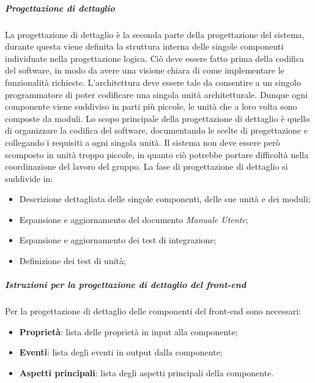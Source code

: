 \subparagraph{Progettazione di dettaglio}
\label{subpar:progettazione_dettaglio}
La progettazione di dettaglio è la seconda parte della progettazione del sistema, durante questa viene definita la struttura interna delle singole componenti individuate nella progettazione logica.
Ciò deve essere fatto prima della codifica del software, in modo da avere una visione chiara di come implementare le funzionalità richieste.
L'architettura deve essere tale da consentire a un singolo programmatore di poter codificare una singola unità architetturale.
Dunque ogni componente viene suddiviso in parti più piccole, le unità che a loro volta sono composte da moduli.
Lo scopo principale della progettazione di dettaglio è quello di organizzare la codifica del software, documentando le scelte di progettazione e collegando i requisiti a ogni singola unità.
Il sistema non deve essere però scomposto in unità troppo piccole, in quanto ciò potrebbe portare difficoltà nella coordinazione del lavoro del gruppo.
La fase di progettazione di dettaglio si suddivide in:
\begin{itemize}
    \item Descrizione dettagliata delle singole componenti, delle sue unità e dei moduli;
    \item Espansione e aggiornamento del documento \textit{Manuale Utente};
    \item Espansione e aggiornamento dei test di integrazione;
    \item Definizione dei test di unità;
\end{itemize} 

\subparagraph{Istruzioni per la progettazione di dettaglio del front-end}
Per la progettazione di dettaglio delle componenti del front-end sono necessari:
\begin{itemize}
    \item \textbf{Proprietà}: lista delle proprietà in input alla componente;
    \item \textbf{Eventi}: lista degli eventi in output dalla componente;
    \item \textbf{Aspetti principali}: lista degli aspetti principali della componente.
\end{itemize}


